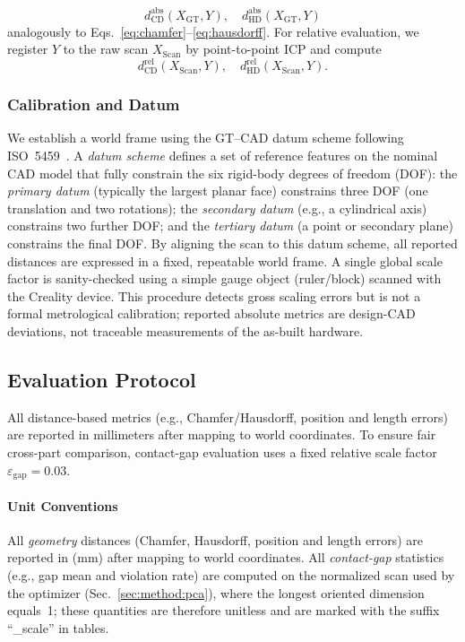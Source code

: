 \documentclass{ieeeaccess}
\begin{document}
\[
d_{\mathrm{CD}}^{\mathrm{abs}}(X_{\mathrm{GT}},Y),\quad
d_{\mathrm{HD}}^{\mathrm{abs}}(X_{\mathrm{GT}},Y)
\]
analogously to Eqs.~\eqref{eq:chamfer}–\eqref{eq:hausdorff}.
For relative evaluation, we register $Y$ to the raw scan $X_{\mathrm{Scan}}$ by point-to-point ICP and compute
\[
d_{\mathrm{CD}}^{\mathrm{rel}}(X_{\mathrm{Scan}},Y),\quad
d_{\mathrm{HD}}^{\mathrm{rel}}(X_{\mathrm{Scan}},Y).
\]


\subsubsection{Calibration and Datum}
\label{sec:calibration}
We establish a world frame using the GT--CAD datum scheme following ISO~5459~\cite{b16}.
A \emph{datum scheme} defines a set of reference features on the nominal CAD model that
fully constrain the six rigid-body degrees of freedom (DOF):
the \emph{primary datum} (typically the largest planar face) constrains three DOF
(one translation and two rotations);
the \emph{secondary datum} (e.g., a cylindrical axis) constrains two further DOF;
and the \emph{tertiary datum} (a point or secondary plane) constrains the final DOF.
By aligning the scan to this datum scheme, all reported distances are expressed in a
fixed, repeatable world frame.
A single global scale factor is sanity-checked using a simple gauge object (ruler/block)
scanned with the Creality device.
This procedure detects gross scaling errors but is not a formal metrological calibration;
reported absolute metrics are design-CAD deviations, not traceable measurements of the
as-built hardware.


\subsection{Evaluation Protocol}
All distance-based metrics (e.g., Chamfer/Hausdorff, position and length errors)
are reported in millimeters after mapping to world coordinates. To ensure fair
cross-part comparison, contact-gap evaluation uses a fixed relative scale factor
$\varepsilon_{\mathrm{gap}} = 0.03$.

\paragraph*{Unit Conventions}
\label{sec:unit_conventions}
All \emph{geometry} distances (Chamfer, Hausdorff, position and length errors) are reported in (mm) after mapping to world coordinates.
All \emph{contact-gap} statistics (e.g., gap mean and violation rate) are computed on the
normalized scan used by the optimizer (Sec.~\ref{sec:method:pca}), where the longest oriented
dimension equals~1; these quantities are therefore unitless and are marked with the suffix
``\_scale'' in tables.
\end{document}
